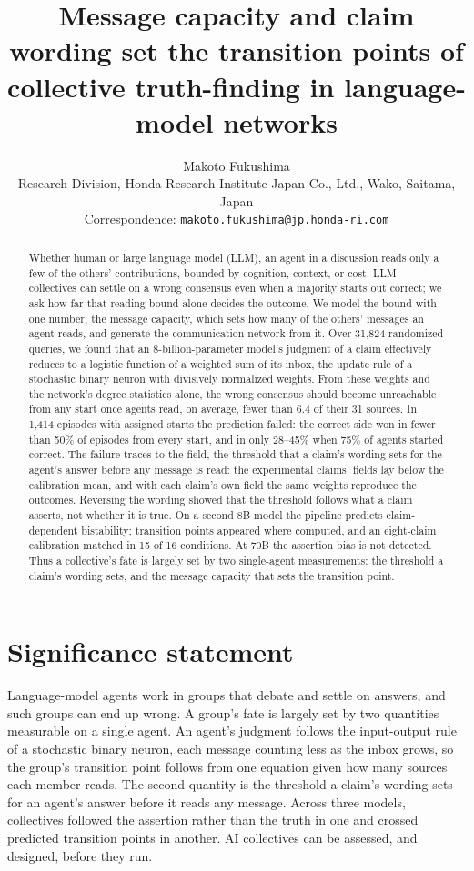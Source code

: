 \documentclass[11pt]{article}
\title{Message capacity and claim wording set the transition points of collective truth-finding in language-model networks}
\author{Makoto Fukushima\\[3pt]
{\normalsize Research Division, Honda Research Institute Japan Co., Ltd.,
Wako, Saitama, Japan}\\[2pt]
{\small Correspondence: \texttt{makoto.fukushima@jp.honda-ri.com}}}
\date{}
\begin{document}
\maketitle

\begin{abstract}
Whether human or large language model (LLM), an agent in a discussion reads
only a few of the others' contributions, bounded by cognition, context, or
cost. LLM collectives can settle on a wrong consensus even when a majority
starts out correct; we ask how far that reading bound alone decides the
outcome. We model the bound with one number, the message capacity, which
sets how many of the others' messages an agent reads, and generate the
communication network from it. Over 31{,}824 randomized queries, we found
that an 8-billion-parameter model's judgment of a claim effectively reduces
to a logistic function of a weighted sum of its inbox, the update rule of a
stochastic binary neuron with divisively normalized weights. From these
weights and the network's degree statistics alone, the wrong consensus
should become unreachable from any start once agents read, on average,
fewer than 6.4 of their 31 sources. In 1{,}414 episodes with assigned
starts the prediction failed: the correct side won in fewer than 50\% of
episodes from every start, and in only 28--45\% when 75\% of agents started
correct. The failure traces to the field, the threshold that a claim's wording sets for the agent's
answer before any message is read: the experimental claims' fields lay below the calibration
mean, and with each claim's own field the same weights reproduce the
outcomes. Reversing the wording showed that the threshold follows what a claim asserts, not whether it is true. On a second 8B model the pipeline predicts
claim-dependent bistability; transition points appeared where computed, and
an eight-claim calibration matched in 15 of 16 conditions. At 70B the
assertion bias is not detected. Thus a collective's fate is largely set by
two single-agent measurements: the threshold a claim's wording sets, and the message capacity that sets
the transition point.
\end{abstract}

\section*{Significance statement}

Language-model agents work in groups that debate and settle on answers, and
such groups can end up wrong. A group's fate is largely set by two quantities
measurable on a single agent. An agent's judgment follows the input-output
rule of a stochastic binary neuron, each message counting less as the inbox
grows, so the group's transition point follows from one equation given how
many sources each member reads. The second quantity is the threshold a
claim's wording sets for an agent's answer before it reads any message.
Across three models, collectives followed the assertion rather than the
truth in one and crossed predicted transition points in another. AI
collectives can be assessed, and designed, before they run.
\end{document}
